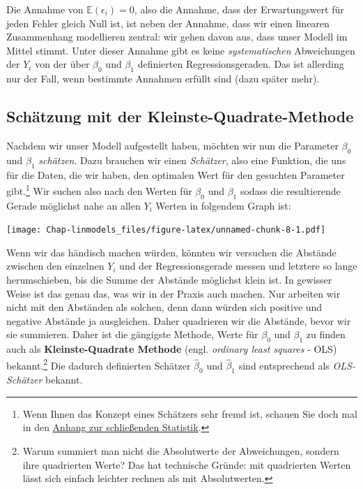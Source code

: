 \documentclass[]{book}
\let\rmarkdownfootnote\footnote%
\def\footnote{\protect\rmarkdownfootnote}
\begin{document}
Die Annahme von \(\mathbb{E}(\epsilon_i)=0\), also die Annahme, dass der
Erwartungswert für jeden Fehler gleich Null ist, ist neben der Annahme,
dass wir einen linearen Zusammenhang modellieren zentral: wir gehen
davon aus, dass unser Modell im Mittel stimmt. Unter dieser Annahme gibt
es keine \emph{systematischen} Abweichungen der \(Y_i\) von der über
\(\beta_0\) und \(\beta_1\) definierten Regressionsgeraden. Das ist
allerding nur der Fall, wenn bestimmte Annahmen erfüllt sind (dazu
später mehr).

\subsection{Schätzung mit der
Kleinste-Quadrate-Methode}\label{schatzung-mit-der-kleinste-quadrate-methode}

Nachdem wir unser Modell aufgestellt haben, möchten wir nun die
Parameter \(\beta_0\) und \(\beta_1\) \emph{schätzen}. Dazu brauchen wir
einen \emph{Schätzer}, also eine Funktion, die uns für die Daten, die
wir haben, den optimalen Wert für den gesuchten Parameter
gibt.\footnote{Wenn Ihnen das Konzept eines Schätzers sehr fremd ist,
  schauen Sie doch mal in den \protect\hyperlink{stat-rep}{Anhang zur
  schließenden Statistik}.} Wir suchen also nach den Werten für
\(\beta_0\) und \(\beta_1\) sodass die resultierende Gerade möglichst
nahe an allen \(Y_i\) Werten in folgendem Graph ist:

\texttt{[image: Chap-linmodels\_files/figure-latex/unnamed-chunk-8-1.pdf]}

Wenn wir das händisch machen würden, könnten wir versuchen die Abstände
zwischen den einzelnen \(Y_i\) und der Regressionsgerade messen und
letztere so lange herumschieben, bis die Summe der Abstände möglichst
klein ist. In gewisser Weise ist das genau das, was wir in der Praxis
auch machen. Nur arbeiten wir nicht mit den Abständen als solchen, denn
dann würden sich positive und negative Abstände ja ausgleichen. Daher
quadrieren wir die Abstände, bevor wir sie summieren. Daher ist die
gängigste Methode, Werte für \(\beta_0\) und \(\beta_1\) zu finden auch
als \textbf{Kleinste-Quadrate Methode} (engl. \emph{ordinary least
squares} - OLS) bekannt.\footnote{Warum summiert man nicht die
  Absolutwerte der Abweichungen, sondern ihre quadrierten Werte? Das hat
  technische Gründe: mit quadrierten Werten lässt sich einfach leichter
  rechnen als mit Absolutwerten.} Die dadurch definierten Schätzer
\(\hat{\beta}_0\) und \(\hat{\beta}_1\) sind entsprechend als
\emph{OLS-Schätzer} bekannt.
\end{document}
